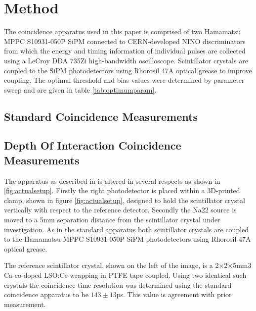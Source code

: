 \section{Method}
The coincidence apparatus used in this paper is comprised of two Hamamatsu MPPC S10931-050P SiPM connected to CERN-developed NINO discriminators from which the energy and timing information of individual pulses are collected using a LeCroy DDA 735Zi high-bandwidth oscilloscope. Scintillator crystals are coupled to the SiPM photodetectors using Rhorosil 47A optical grease to improve coupling. The optimal threshold and bias values were determined by parameter sweep and are given in table \ref{tab:optimumparam}.

\subsection{Standard Coincidence Measurements}

\subsection{Depth Of Interaction Coincidence Measurements}
The apparatus as described in \cite{arron_Meyer_Pauwels_Lecoq_2012} is altered in several respects as shown in \ref{fig:actualsetup}. Firstly the right photodetector is placed within a 3D-printed clamp, shown in figure \ref{fig:actualsetup}, designed to hold the scintillator crystal vertically with respect to the reference detector. Secondly the Na22 source is moved to a 5mm separation distance from the scintillator crystal under investigation. As in the standard apparatus both scintillator crystals are coupled to the Hamamatsu MPPC S10931-050P SiPM photodetectors using Rhorosil 47A optical grease. 

The reference scintillator crystal, shown on the left of the image, is a 2×2×5mm3 Ca-co-doped LSO:Ce wrapping in PTFE tape coupled. Using two identical such crystals the coincidence time resolution was determined using the standard coincidence apparatus to be $143\pm13$ps. This value is agreement with prior measurement\cite{arron_Meyer_Pauwels_Lecoq_2012}.